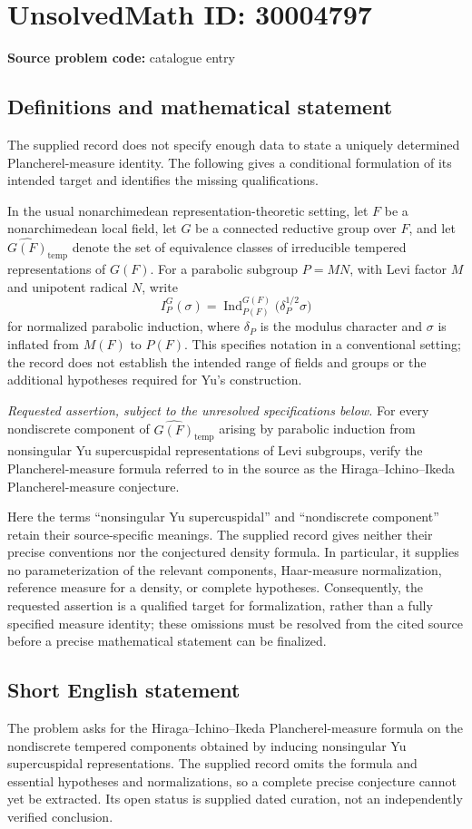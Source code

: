\documentclass[11pt]{article}
\begin{document}
\section*{UnsolvedMath ID: 30004797}
\textbf{Source problem code:} catalogue entry
\subsection{Definitions and mathematical statement}
The supplied record does not specify enough data to state a uniquely determined Plancherel-measure identity. The following gives a conditional formulation of its intended target and identifies the missing qualifications.

In the usual nonarchimedean representation-theoretic setting, let \(F\) be a nonarchimedean local field, let \(G\) be a connected reductive group over \(F\), and let \(\widehat{G(F)}_{\mathrm{temp}}\) denote the set of equivalence classes of irreducible tempered representations of \(G(F)\). For a parabolic subgroup \(P=MN\), with Levi factor \(M\) and unipotent radical \(N\), write
\[
I_P^G(\sigma)=\operatorname{Ind}_{P(F)}^{G(F)}\bigl(\delta_P^{1/2}\sigma\bigr)
\]
for normalized parabolic induction, where \(\delta_P\) is the modulus character and \(\sigma\) is inflated from \(M(F)\) to \(P(F)\). This specifies notation in a conventional setting; the record does not establish the intended range of fields and groups or the additional hypotheses required for Yu's construction.

\emph{Requested assertion, subject to the unresolved specifications below.} For every nondiscrete component of \(\widehat{G(F)}_{\mathrm{temp}}\) arising by parabolic induction from nonsingular Yu supercuspidal representations of Levi subgroups, verify the Plancherel-measure formula referred to in the source as the Hiraga--Ichino--Ikeda Plancherel-measure conjecture.

Here the terms ``nonsingular Yu supercuspidal'' and ``nondiscrete component'' retain their source-specific meanings. The supplied record gives neither their precise conventions nor the conjectured density formula. In particular, it supplies no parameterization of the relevant components, Haar-measure normalization, reference measure for a density, or complete hypotheses. Consequently, the requested assertion is a qualified target for formalization, rather than a fully specified measure identity; these omissions must be resolved from the cited source before a precise mathematical statement can be finalized.
\subsection{Short English statement}
The problem asks for the Hiraga--Ichino--Ikeda Plancherel-measure formula on the nondiscrete tempered components obtained by inducing nonsingular Yu supercuspidal representations. The supplied record omits the formula and essential hypotheses and normalizations, so a complete precise conjecture cannot yet be extracted. Its open status is supplied dated curation, not an independently verified conclusion.
\end{document}

